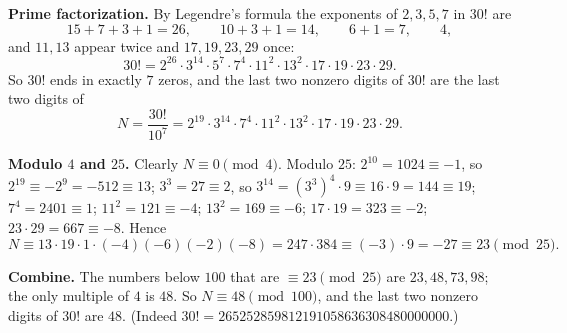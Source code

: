 \textbf{Prime factorization.} By Legendre's formula the exponents of $2,3,5,7$ in $30!$ are
\[
15+7+3+1=26,\qquad 10+3+1=14,\qquad 6+1=7,\qquad 4,
\]
and $11,13$ appear twice and $17,19,23,29$ once:
\[
30!=2^{26}\cdot3^{14}\cdot5^{7}\cdot7^4\cdot11^2\cdot13^2\cdot17\cdot19\cdot23\cdot29 .
\]
So $30!$ ends in exactly $7$ zeros, and the last two nonzero digits of $30!$ are the last two digits of
\[
N=\dfrac{30!}{10^7}=2^{19}\cdot3^{14}\cdot7^4\cdot11^2\cdot13^2\cdot17\cdot19\cdot23\cdot29 .
\]

\textbf{Modulo $4$ and $25$.} Clearly $N\equiv0\pmod4$. Modulo $25$: $2^{10}=1024\equiv-1$, so $2^{19}\equiv-2^9=-512\equiv13$; $3^3=27\equiv2$, so $3^{14}=(3^3)^4\cdot9\equiv16\cdot9=144\equiv19$; $7^4=2401\equiv1$; $11^2=121\equiv-4$; $13^2=169\equiv-6$; $17\cdot19=323\equiv-2$; $23\cdot29=667\equiv-8$. Hence
\[
N\equiv13\cdot19\cdot1\cdot(-4)(-6)(-2)(-8)=247\cdot384\equiv(-3)\cdot9=-27\equiv23\pmod{25}.
\]

\textbf{Combine.} The numbers below $100$ that are $\equiv23\pmod{25}$ are $23,48,73,98$; the only multiple of $4$ is $48$. So $N\equiv48\pmod{100}$, and the last two nonzero digits of $30!$ are $\boxed{48}$. (Indeed $30!=265252859812191058636308480000000$.)
